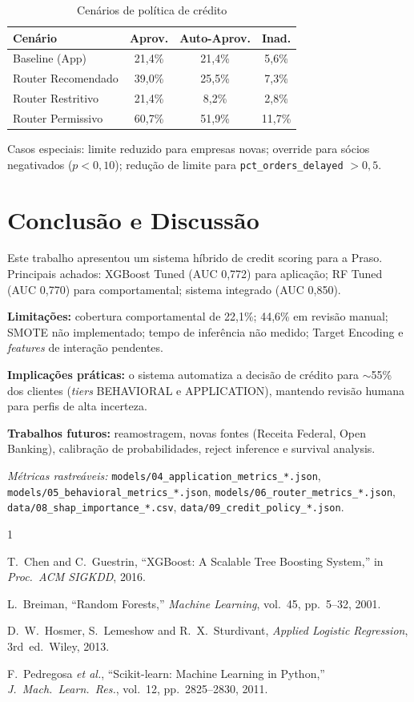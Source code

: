 \documentclass[conference]{IEEEtran}
\newcommand{\code}[1]{\texttt{#1}}
\begin{document}
\begin{table}[!t]
\caption{Cenários de política de crédito}
\label{tab:policy-scen}
\centering
\small
\begin{tabular}{lccc}
\toprule
\textbf{Cenário} & \textbf{Aprov.} & \textbf{Auto-Aprov.} & \textbf{Inad.} \\
\midrule
Baseline (App) & 21,4\% & 21,4\% & 5,6\% \\
Router Recomendado & 39,0\% & 25,5\% & 7,3\% \\
Router Restritivo & 21,4\% & 8,2\% & 2,8\% \\
Router Permissivo & 60,7\% & 51,9\% & 11,7\% \\
\bottomrule
\end{tabular}
\end{table}

Casos especiais: limite reduzido para empresas novas; override para sócios negativados ($p < 0{,}10$); redução de limite para \code{pct\_orders\_delayed} $> 0{,}5$.

\section{Conclusão e Discussão}

Este trabalho apresentou um sistema híbrido de credit scoring para a Praso. Principais achados: XGBoost Tuned (AUC 0,772) para aplicação; RF Tuned (AUC 0,770) para comportamental; sistema integrado (AUC 0,850).

\textbf{Limitações:} cobertura comportamental de 22,1\%; 44,6\% em revisão manual; SMOTE não implementado; tempo de inferência não medido; Target Encoding e \textit{features} de interação pendentes.

\textbf{Implicações práticas:} o sistema automatiza a decisão de crédito para $\sim$55\% dos clientes (\textit{tiers} BEHAVIORAL e APPLICATION), mantendo revisão humana para perfis de alta incerteza.

\textbf{Trabalhos futuros:} reamostragem, novas fontes (Receita Federal, Open Banking), calibração de probabilidades, reject inference e survival analysis.

\noindent\textit{Métricas rastreáveis:} \code{models/04\_application\_metrics\_*.json}, \code{models/05\_behavioral\_metrics\_*.json}, \code{models/06\_router\_metrics\_*.json}, \code{data/08\_shap\_importance\_*.csv}, \code{data/09\_credit\_policy\_*.json}.

\begin{thebibliography}{1}

T.~Chen and C.~Guestrin, ``XGBoost: A Scalable Tree Boosting System,'' in \emph{Proc.\ ACM SIGKDD}, 2016.

L.~Breiman, ``Random Forests,'' \emph{Machine Learning}, vol.~45, pp.~5--32, 2001.

D.~W.~Hosmer, S.~Lemeshow and R.~X.~Sturdivant, \emph{Applied Logistic Regression}, 3rd~ed.\ Wiley, 2013.

F.~Pedregosa \emph{et al.}, ``Scikit-learn: Machine Learning in Python,'' \emph{J.\ Mach.\ Learn.\ Res.}, vol.~12, pp.~2825--2830, 2011.

\end{thebibliography}
\end{document}
